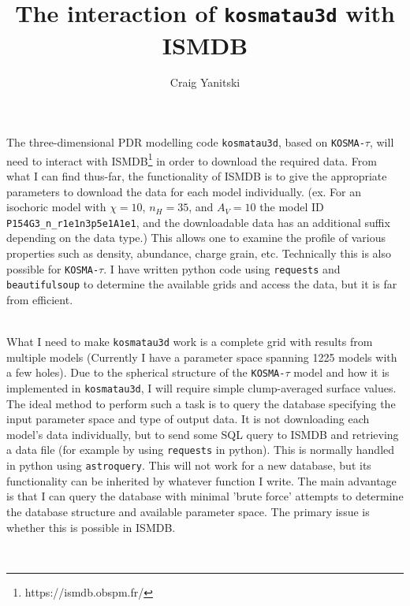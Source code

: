 \documentclass[a4paper]{article}
\newcommand{\kosmatau}{\texttt{KOSMA-\(\tau\)}}
\newcommand{\kttd}{\texttt{kosmatau3d}}
\begin{document}
	
    \title{The interaction of \texttt{kosmatau3d} with ISMDB}
    \author{Craig Yanitski}
    \date{}
    \maketitle

    The three-dimensional PDR modelling code \kttd, based on \kosmatau, will need to interact with ISMDB\footnote{https://ismdb.obspm.fr/} in order to download the required data.
    From what I can find thus-far, the functionality of ISMDB is to give the appropriate parameters to download the data for each model individually.
    (ex. For an isochoric model with \(\chi=10\), \(n_H=35\), and \(A_V=10\) the model ID \texttt{P154G3\_n\_r1e1n3p5e1A1e1}, and the downloadable data has an additional suffix depending on the data type.)
    This allows one to examine the profile of various properties such as density, abundance, charge grain, etc.
    Technically this is also possible for \kosmatau.
    I have written python code using \texttt{requests} and \texttt{beautifulsoup} to determine the available grids and access the data, but it is far from efficient.%

	\hfill \\

    What I need to make {\kttd} work is a complete grid with results from multiple models (Currently I have a parameter space spanning 1225 models with a few holes).
    Due to the spherical structure of the {\kosmatau} model and how it is implemented in \kttd, I will require simple clump-averaged surface values.
    The ideal method to perform such a task is to query the database specifying the input parameter space and type of output data.
    It is not downloading each model's data individually, but to send some SQL query to ISMDB and retrieving a data file (for example by using \texttt{requests} in python).
    This is normally handled in python using \texttt{astroquery}.
    This will not work for a new database, but its functionality can be inherited by whatever function I write.
    The main advantage is that I can query the database with minimal 'brute force' attempts to determine the database structure and available parameter space.
    The primary issue is whether this is possible in ISMDB.%
    
    \hfill \\
\end{document}

